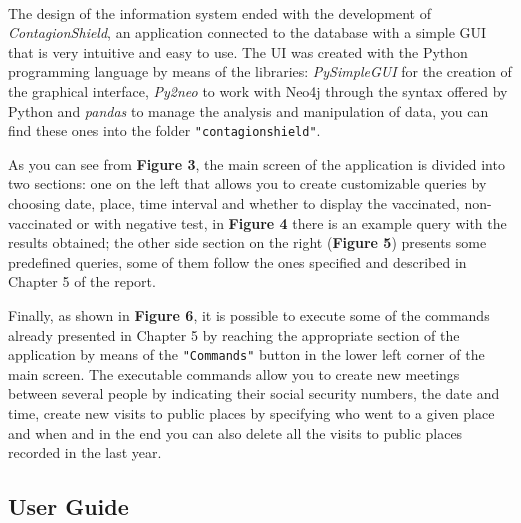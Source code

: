 \documentclass[a4paper,12pt]{article}
\begin{document}
\paragraph{}The design of the information system ended with the development of \emph{ContagionShield}, an application connected to the database with a simple GUI that is very intuitive and easy to use. The UI was created with the Python programming language by means of the libraries: \emph{PySimpleGUI} for the creation of the graphical interface, \emph{Py2neo} to work with Neo4j through the syntax offered by Python and \emph{pandas} to manage the analysis and manipulation of data, you can find these ones into the folder \texttt{"contagionshield"}. \par

As you can see from \textbf{Figure 3}, the main screen of the application is divided into two sections: one on the left that allows you to create customizable queries by choosing date, place, time interval and whether to display the vaccinated, non-vaccinated or with negative test, in \textbf{Figure 4} there is an example query with the results obtained; the other side section on the right (\textbf{Figure 5}) presents some predefined queries, some of them follow the ones specified and described in Chapter 5 of the report. \par

\pagebreak
Finally, as shown in \textbf{Figure 6}, it is possible to execute some of the commands already presented in Chapter 5 by reaching the appropriate section of the application by means of the \texttt{"Commands"} button in the lower left corner of the main screen. The executable commands allow you to create new meetings between several people by indicating their social security numbers, the date and time, create new visits to public places by specifying who went to a given place and when and in the end you can also delete all the visits to public places recorded in the last year. \par

\subsection{User Guide}
\end{document}
